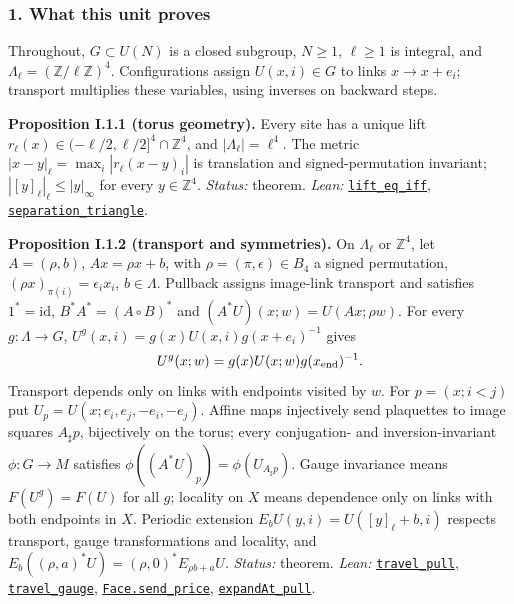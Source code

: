 \documentclass[
  letterpaper,
  11pt]{article}
\begin{document}
\subsubsection{1. What this unit proves}\label{what-this-unit-proves}

Throughout, \(G\subset U(N)\) is a closed subgroup, \(N\ge1\),
\(\ell\ge1\) is integral, and
\(\Lambda_\ell=(\mathbb Z/\ell\mathbb Z)^4\). Configurations assign
\(U(x,i)\in G\) to links \(x\to x+e_i\); transport multiplies these
variables, using inverses on backward steps.

\textbf{Proposition I.1.1 (torus geometry).} Every site has a unique
lift \(r_\ell(x)\in(-\ell/2,\ell/2]^4\cap\mathbb Z^4\), and
\(|\Lambda_\ell|=\ell^4\). The metric
\(|x-y|_\ell=\max_i|r_\ell(x-y)_i|\) is translation and
signed-permutation invariant; \(|[y]_\ell|_\ell\le|y|_\infty\) for every
\(y\in\mathbb Z^4\). \emph{Status:} theorem. \emph{Lean:}
\href{https://github.com/yang-mills-group/OpenAI-YM-20261028/blob/3456e5e75cf8d4cd558955a5c7638fba2d68f464/YM/Lattice/Site.lean\#L61-L68}{\texttt{lift\_eq\_iff}},
\href{https://github.com/yang-mills-group/OpenAI-YM-20261028/blob/3456e5e75cf8d4cd558955a5c7638fba2d68f464/YM/Lattice/Site.lean\#L103-L105}{\texttt{separation\_triangle}}.

\textbf{Proposition I.1.2 (transport and symmetries).} On
\(\Lambda_\ell\) or \(\mathbb Z^4\), let \(A=(\rho,b)\),
\(Ax=\rho x+b\), with \(\rho=(\pi,\epsilon)\in B_4\) a signed
permutation, \((\rho x)_{\pi(i)}=\epsilon_ix_i\), \(b\in\Lambda\).
Pullback assigns image-link transport and satisfies \(1^*=\mathrm{id}\),
\(B^*A^*=(A\circ B)^*\) and \((A^*U)(x;w)=U(Ax;\rho w)\). For every
\(g:\Lambda\to G\), \(U^g(x,i)=g(x)U(x,i)g(x+e_i)^{-1}\) gives
\[U^g(x;w)=g(x)U(x;w)g(x_{\rm end})^{-1}.\] Transport depends only on
links with endpoints visited by \(w\). For \(p=(x;i<j)\) put
\(U_p=U(x;e_i,e_j,-e_i,-e_j)\). Affine maps injectively send plaquettes
to image squares \(A_\sharp p\), bijectively on the torus; every
conjugation- and inversion-invariant \(\phi:G\to M\) satisfies
\(\phi((A^*U)_p)=\phi(U_{A_\sharp p})\). Gauge invariance means
\(F(U^g)=F(U)\) for all \(g\); locality on \(X\) means dependence only
on links with both endpoints in \(X\). Periodic extension
\(E_bU(y,i)=U([y]_\ell+b,i)\) respects transport, gauge transformations
and locality, and \(E_b((\rho,a)^*U)=(\rho,0)^*E_{\rho b+a}U\).
\emph{Status:} theorem. \emph{Lean:}
\href{https://github.com/yang-mills-group/OpenAI-YM-20261028/blob/3456e5e75cf8d4cd558955a5c7638fba2d68f464/YM/Lattice/Path.lean\#L160-L167}{\texttt{travel\_pull}},
\href{https://github.com/yang-mills-group/OpenAI-YM-20261028/blob/3456e5e75cf8d4cd558955a5c7638fba2d68f464/YM/Lattice/Path.lean\#L141-L143}{\texttt{travel\_gauge}},
\href{https://github.com/yang-mills-group/OpenAI-YM-20261028/blob/3456e5e75cf8d4cd558955a5c7638fba2d68f464/YM/Lattice/Faces.lean\#L128-L143}{\texttt{Face.send\_price}},
\href{https://github.com/yang-mills-group/OpenAI-YM-20261028/blob/3456e5e75cf8d4cd558955a5c7638fba2d68f464/YM/Lattice/Path.lean\#L227-L235}{\texttt{expandAt\_pull}}.
\end{document}
